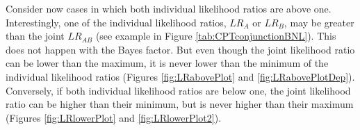 \documentclass[
  10pt,
  dvipsnames,enabledeprecatedfontcommands]{scrartcl}
\begin{document}
Consider now cases in which both individual likelihood ratios are above
one. Interestingly, one of the individual likelihood ratios, \(LR_A\) or
\(LR_B\), may be greater than the joint \(LR_{AB}\) (see example in
Figure \ref{tab:CPTconjunctionBNL}). This does not happen with the Bayes
factor. But even though the joint likelihood ratio can be lower than the
maximum, it is never lower than the minimum of the individual likelihood
ratios (Figures \ref{fig:LRabovePlot} and \ref{fig:LRabovePlotDep}).
Conversely, if both individual likelihood ratios are below one, the
joint likelihood ratio can be higher than their minimum, but is never
higher than their maximum (Figures \ref{fig:LRlowerPlot} and
\ref{fig:LRlowerPlot2}).

\vspace{1mm}
\footnotesize

\normalsize

\vspace{1mm}
\footnotesize

\normalsize
\end{document}
